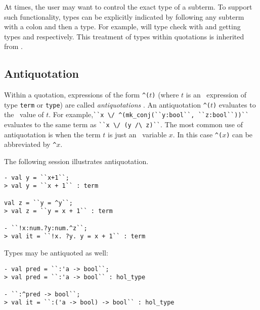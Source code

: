 At times, the user may want to control the exact type of a subterm. To
support such functionality, types can be explicitly indicated by
following any subterm with a colon and then a type.  For example,
 will type check with  and 
getting types  and  respectively. 
This treatment of types within quotations is inherited from
\LCF{}.   \index{ term quotes, in ML@\ml{`$\cdots$`} (term quotes, in
  \ML)|)}

\subsection{Antiquotation}

Within a quotation, expressions of the form {\small\verb+^(+}$t${\small\verb+)+}
%
%
(where $t$ is an \ML\ expression of type
%
%
{\small\verb+term+} or {\small\verb+type+}) are called {\it antiquotations\/}
%
.
%
An antiquotation {\small\verb+^(+}$t${\small\verb+)+} evaluates to the
\ML\ value of $t$. For example,{\small\verb+``x \/ ^(mk_conj(``y:bool``, ``z:bool``))``+}
evaluates to the same term as {\small\verb+``x \/ (y /\ z)``+}. The
most common use of antiquotation is when the term $t$ is just an \ML\
variable $x$. In this case {\small\verb+^(+}$x${\small\verb+)+} can be
abbreviated by {\small\verb+^+}$x$.

The following session illustrates antiquotation.

\setcounter{sessioncount}{1}
\begin{session}
\begin{verbatim}
- val y = ``x+1``;
> val y = ``x + 1`` : term

val z = ``y = ^y``;
> val z = ``y = x + 1`` : term

- ``!x:num.?y:num.^z``;
> val it = ``!x. ?y. y = x + 1`` : term
\end{verbatim}
\end{session}

\noindent Types may be antiquoted as well:

\setcounter{sessioncount}{1}
\begin{session}
\begin{verbatim}
- val pred = ``:'a -> bool``;
> val pred = ``:'a -> bool`` : hol_type

- ``:^pred -> bool``;
> val it = ``:('a -> bool) -> bool`` : hol_type
\end{verbatim}
\end{session}

